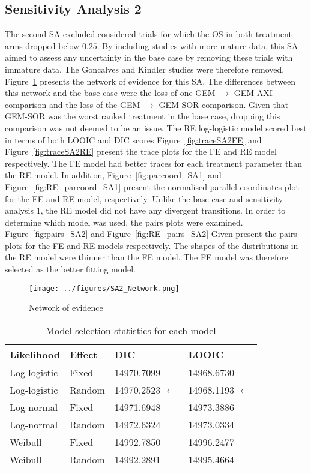 \subsection{Sensitivity Analysis 2}
The second SA excluded considered trials for which the OS in both treatment arms dropped below $0.25$. By including studies with more mature data, this SA aimed to assess any uncertainty in the base case by removing these trials with immature data. The Goncalves and Kindler studies were therefore removed. Figure~\ref{fig:sa2net} presents the network of evidence for this SA. The differences between this network and the base case were the loss of one GEM $\rightarrow$ GEM-AXI comparison and the loss of the GEM $\rightarrow$ GEM-SOR comparison. Given that GEM-SOR was the worst ranked treatment in the base case, dropping this comparison was not deemed to be an issue. The RE log-logistic model scored best in terms of both LOOIC and DIC scores Figure~\ref{fig:traceSA2FE} and Figure~\ref{fig:traceSA2RE} present the trace plots for the FE and RE model respectively. The FE model had better traces for each treatment parameter than the RE model. In addition, Figure~\ref{fig:parcoord_SA1} and Figure~\ref{fig:RE_parcoord_SA1} present the normalised parallel coordinates plot for the FE and RE model, respectively. Unlike the base case and sensitivity analysis 1, the RE model did not have any divergent transitions. In order to determine which model was used, the pairs plots were examined. Figure~\ref{fig:pairs_SA2} and Figure~\ref{fig:RE_pairs_SA2} Given present the pairs plots for the FE and RE models respectively. The shapes of the distributions in the RE model were thinner than the FE model. The FE model was therefore selected as the better fitting model. \\

\begin{figure}[h]
    \centering
    \texttt{[image: ../figures/SA2\_Network.png]}
    \caption{Network of evidence}
    \label{fig:sa2net}
\end{figure}

\begin{table}[h]
    \centering
    \begin{tabular}{llll}
    \hline
    Likelihood   & Effect & DIC        & LOOIC      \\ \hline
    Log-logistic & Fixed  & 14970.7099 & 14968.6730 \\
    Log-logistic & Random & 14970.2523 $\leftarrow$ & 14968.1193 $\leftarrow$ \\
    Log-normal   & Fixed  & 14971.6948 & 14973.3886 \\
    Log-normal   & Random & 14972.6324 & 14973.0334 \\
    Weibull      & Fixed  & 14992.7850 & 14996.2477 \\
    Weibull      & Random & 14992.2891 & 14995.4664 \\ \hline
    \end{tabular}
    \caption{Model selection statistics for each model}
    \label{selectStatSA2}
\end{table}

